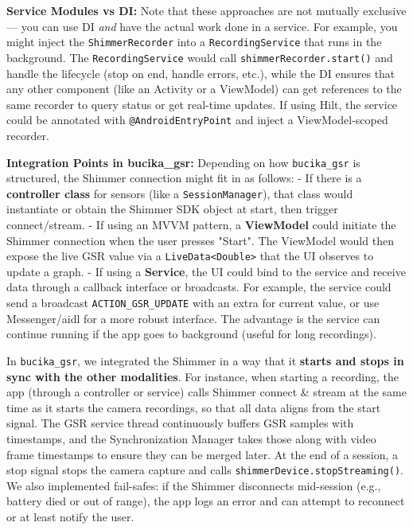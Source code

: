 {{\textbf{Service Modules vs DI:} Note that these approaches are not mutually
exclusive --- you can use DI \textit{and} have the actual work done in a
service. For example, you might inject the \texttt{ShimmerRecorder} into a
\texttt{RecordingService} that runs in the background. The \texttt{RecordingService}
would call \texttt{shimmerRecorder.start()} and handle the lifecycle (stop on
end, handle errors, etc.), while the DI ensures that any other component
(like an Activity or a ViewModel) can get references to the same
recorder to query status or get real-time updates. If using Hilt, the
service could be annotated with \texttt{@AndroidEntryPoint} and inject a
ViewModel-scoped recorder.

\textbf{Integration Points in bucika_gsr:} Depending on how \texttt{bucika_gsr} is
structured, the Shimmer connection might fit in as follows: - If there
is a \textbf{controller class} for sensors (like a \texttt{SessionManager}), that
class would instantiate or obtain the Shimmer SDK object at start, then
trigger connect/stream. - If using an MVVM pattern, a \textbf{ViewModel}
could initiate the Shimmer connection when the user presses "Start". The
ViewModel would then expose the live GSR value via a \texttt{LiveData<Double>}
that the UI observes to update a graph. - If using a \textbf{Service}, the UI
could bind to the service and receive data through a callback interface
or broadcasts. For example, the service could send a broadcast
\texttt{ACTION_GSR_UPDATE} with an extra for current value, or use
Messenger/aidl for a more robust interface. The advantage is the service
can continue running if the app goes to background (useful for long
recordings).

In \texttt{bucika_gsr}, we integrated the Shimmer in a way that it \textbf{starts and
stops in sync with the other modalities}. For instance, when starting a
recording, the app (through a controller or service) calls Shimmer
connect & stream at the same time as it starts the camera recordings, so
that all data aligns from the start
signal\cite{ref36}\cite{ref37}.
The GSR service thread continuously buffers GSR samples with timestamps,
and the Synchronization Manager takes those along with video frame
timestamps to ensure they can be merged later. At the end of a session,
a stop signal stops the camera capture and calls
\texttt{shimmerDevice.stopStreaming()}. We also implemented fail-safes: if the
Shimmer disconnects mid-session (e.g., battery died or out of range),
the app logs an error and can attempt to reconnect or at least notify
the user.

}}
